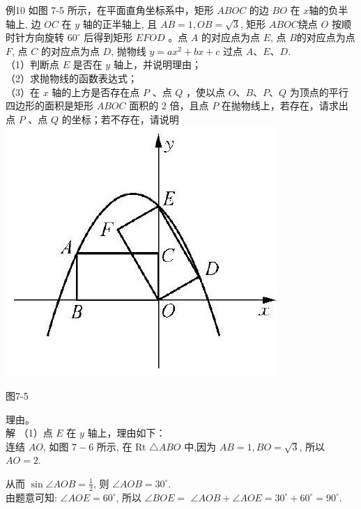 \documentclass[10pt]{article}
\begin{document}
例10 如图 7-5 所示，在平面直角坐标系中，矩形 $A B O C$ 的边 $B O$ 在 $x$轴的负半轴上, 边 $O C$ 在 $y$ 轴的正半轴上, 且 $A B=1, O B=\sqrt{3}$, 矩形 $A B O C$绕点 $O$ 按顺时针方向旋转 $60^{\circ}$ 后得到矩形 $E F O D$ 。点 $A$ 的对应点为点 $E$, 点 $B$的对应点为点 $F$, 点 $C$ 的对应点为点 $D$, 抛物线 $y=a x^{2}+b x+c$ 过点 $A 、 E 、 D$.\\
（1）判断点 $E$ 是否在 $y$ 轴上，并说明理由；\\
（2）求抛物线的函数表达式；\\
（3）在 $x$ 轴的上方是否存在点 $P$ 、点 $Q$ ，使以点 $O 、 B 、 P 、 Q$ 为顶点的平行四边形的面积是矩形 $A B O C$ 面积的 2 倍，且点 $P$ 在抛物线上，若存在，请求出点 $P$ 、点 $Q$ 的坐标；若不存在，请说明\\
\includegraphics[max width=\textwidth, center]{2024_10_30_1bf34f7aeb61f11d11d3g-099(1)}

图7-5

理由。\\
解 （1）点 $E$ 在 $y$ 轴上，理由如下：\\
连结 $A O$, 如图 $7-6$ 所示, 在 Rt $\triangle A B O$ 中,因为 $A B=1, B O=\sqrt{3}$, 所以 $A O=2$.

从而 $\sin \angle A O B=\frac{1}{2}$, 则 $\angle A O B=30^{\circ}$.\\
由题意可知: $\angle A O E=60^{\circ}$, 所以 $\angle B O E=$ $\angle A O B+\angle A O E=30^{\circ}+60^{\circ}=90^{\circ}$.
\end{document}
